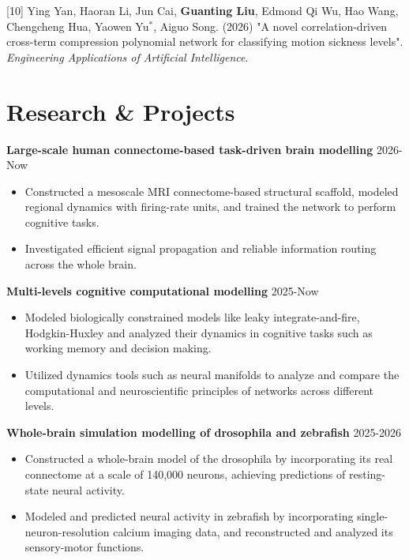 \documentclass[UTF8,11pt]{ctexart}
\begin{document}
\vspace{0.5em}
[10] Ying Yan, Haoran Li, Jun Cai, \textbf{Guanting Liu}, Edmond Qi Wu, Hao Wang, Chengcheng Hua, Yaowen Yu$^*$, Aiguo Song. (2026) "A novel correlation-driven cross-term compression polynomial network for classifying motion sickness levels". \textit{Engineering Applications of Artificial Intelligence}.



\section*{Research \& Projects}

\textbf{Large-scale human connectome-based task-driven brain modelling} \hfill 2026-Now
\begin{itemize}[leftmargin=1.0em, topsep=0pt, itemsep=0pt]
    \item Constructed a mesoscale MRI connectome-based structural scaffold, modeled regional dynamics with firing-rate units, and trained the network to perform cognitive tasks.
    \item Investigated efficient signal propagation and reliable information routing across the whole brain.
\end{itemize}

\textbf{Multi-levels cognitive computational modelling} \hfill 2025-Now
\begin{itemize}[leftmargin=1.0em, topsep=0pt, itemsep=0pt]
    \item Modeled biologically constrained models like leaky integrate-and-fire, Hodgkin-Huxley and analyzed their dynamics in cognitive tasks such as working memory and decision making.
    \item Utilized dynamics tools such as neural manifolds to analyze and compare the computational and neuroscientific principles of networks across different levels.
\end{itemize}

\textbf{Whole-brain simulation modelling of drosophila and zebrafish} \hfill 2025-2026
\begin{itemize}[leftmargin=1.0em, topsep=0pt, itemsep=0pt]
    \item Constructed a whole-brain model of the drosophila by incorporating its real connectome at a scale of 140,000 neurons, achieving predictions of resting-state neural activity.
    \item Modeled and predicted neural activity in zebrafish by incorporating single-neuron-resolution calcium imaging data, and reconstructed and analyzed its sensory-motor functions.
\end{itemize}
\end{document}
